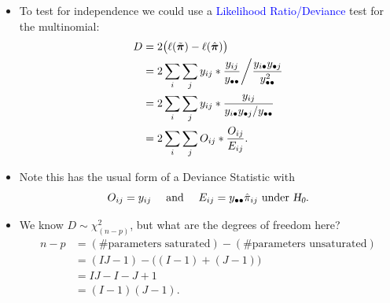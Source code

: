 \documentclass{article}\usepackage[]{graphicx}\usepackage[svgnames]{xcolor}
\let\log\relax%
\newcommand{\HN}{\textsl{H}_{\textsl{0}}}%
\providecommand{\Vector}[1]{\bm{#1}}%
\begin{document}
\begin{itemize}
      \item To test for independence we could use a \textcolor{Blue}{Likelihood Ratio/Deviance} test for the
            multinomial:
            \begin{align*}
                  D
                   & =2\bigl(\ell(\tilde{\Vector{\pi}})-\ell(\hat{\Vector{\pi}})\bigr)                                                             \\
                   & =2\sum_i\sum_j y_{ij}\log*{\frac{y_{ij}}{y_{\bullet\bullet}}\bigg/\frac{y_{i \bullet} y_{\bullet j}}{y_{\bullet\bullet}^{2}}} \\
                   & =2\sum_i\sum_j y_{ij}\log*{\frac{y_{ij}}{y_{i\bullet}y_{\bullet j}/y_{\bullet\bullet}}}                                       \\
                   & =2\sum_i\sum_j O_{ij}\log*{\frac{O_{ij}}{E_{ij}}}.
            \end{align*}
      \item Note this has the usual form of a Deviance Statistic with
            \[ O_{ij}=y_{ij}\quad\text{ and }\quad E_{ij}=y_{\bullet\bullet}\hat{\pi}_{ij}\text{ under $ \HN $}. \]
      \item We know $ D \sim \chi^2_{(n-p)} $, but what are the degrees of freedom here?
            \begin{align*}
                  n-p
                   & =(\text{\# parameters saturated})-(\text{\# parameters unsaturated}) \\
                   & =(IJ-1)-\bigl((I-1)+(J-1)\bigr)                                      \\
                   & =IJ-I-J+1                                                            \\
                   & =(I-1)(J-1).
            \end{align*}
\end{itemize}
\end{document}
